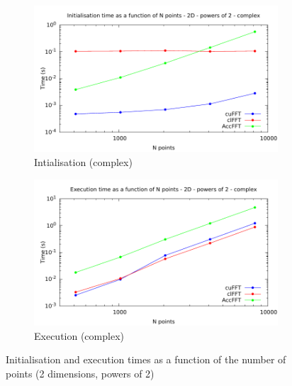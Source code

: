 \documentclass[12pt, a4paper]{article}
\begin{document}
\begin{figure}[H]
\begin{subfigure}{.5\textwidth}
\centering
\includegraphics[width=.9\linewidth]{graphs/fft-2d-pow2-c-init.pdf}
\caption{Intialisation (complex)}
\label{FFTPOW22DCI}
\end{subfigure}%
\begin{subfigure}{.5\textwidth}
\centering
\includegraphics[width=.9\linewidth]{graphs/fft-2d-pow2-c-exec.pdf}
\caption{Execution (complex)}
\label{FFTPOW22DCE}
\end{subfigure}
\caption{Initialisation and execution times as a function of the number of points (2 dimensions, powers of 2)}
\label{FFTPOW22D}
\end{figure}
\end{document}
